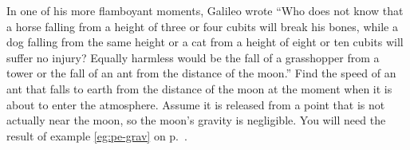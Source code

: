 \answercheck In one of his more flamboyant moments, Galileo wrote
``Who does not know that a horse falling from a height of
three or four cubits will break his bones, while a dog
falling from the same height or a cat from a height of eight
or ten cubits will suffer no injury? Equally harmless would
be the fall of a grasshopper from a tower or the fall of an
ant from the distance of the moon.'' Find the speed of an
ant that falls to earth from the distance of the moon at the
moment when it is about to enter the atmosphere. Assume it
is released from a point that is not actually near the moon,
so the moon's gravity is negligible.
You will need the result of example \ref{eg:pe-grav} on p.~\pageref{eg:pe-grav}.
